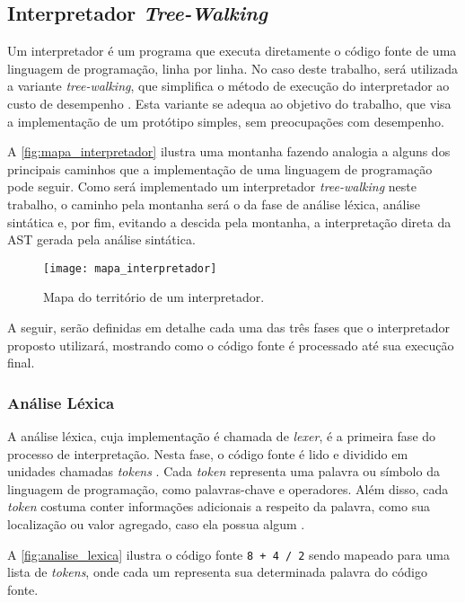 \subsection{Interpretador \textit{Tree-Walking}}

Um interpretador é um programa que executa diretamente o código fonte de uma linguagem de programação, linha por linha. No caso deste trabalho, será utilizada a variante \textit{tree-walking}, que simplifica o método de execução do interpretador ao custo de desempenho \cite{craftinginterpreters}. Esta variante se adequa ao objetivo do trabalho, que visa a implementação de um protótipo simples, sem preocupações com desempenho.

A \autoref{fig:mapa_interpretador} ilustra uma montanha fazendo analogia a alguns dos principais caminhos que a implementação de uma linguagem de programação pode seguir. Como será implementado um interpretador \textit{tree-walking} neste trabalho, o caminho pela montanha será o da fase de análise léxica, análise sintática e, por fim, evitando a descida pela montanha, a interpretação direta da AST gerada pela análise sintática.

\begin{figure}[H]
	\centering
	\texttt{[image: mapa\_interpretador]}
	\caption{Mapa do território de um interpretador.}
	\label{fig:mapa_interpretador}
\end{figure}

A seguir, serão definidas em detalhe cada uma das três fases que o interpretador proposto utilizará, mostrando como o código fonte é processado até sua execução final.

\subsubsection{Análise Léxica}

A análise léxica, cuja implementação é chamada de \textit{lexer}, é a primeira fase do processo de interpretação. Nesta fase, o código fonte é lido e dividido em unidades chamadas \textit{tokens} \cite{craftinginterpreters}. Cada \textit{token} representa uma palavra ou símbolo da linguagem de programação, como palavras-chave e operadores. Além disso, cada \textit{token} costuma conter informações adicionais a respeito da palavra, como sua localização ou valor agregado, caso ela possua algum \cite{craftinginterpreters}.

A \autoref{fig:analise_lexica} ilustra o código fonte \texttt{8 + 4 / 2} sendo mapeado para uma lista de \textit{tokens}, onde cada um representa sua determinada palavra do código fonte.

